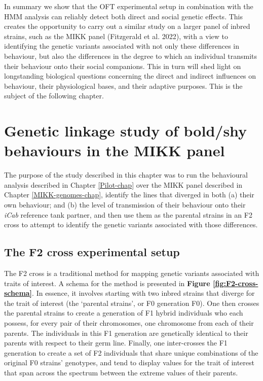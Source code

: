 \documentclass[
]{book}
\begin{document}
In summary we show that the OFT experimental setup in combination with the HMM analysis can reliably detect both direct and social genetic effects. This creates the opportunity to carry out a similar study on a larger panel of inbred strains, such as the MIKK panel (Fitzgerald et al. 2022), with a view to identifying the genetic variants associated with not only these differences in behaviour, but also the differences in the degree to which an individual transmits their behaviour onto their social companions. This in turn will shed light on longstanding biological questions concerning the direct and indirect influences on behaviour, their physiological bases, and their adaptive purposes. This is the subject of the following chapter.

\hypertarget{MIKK-F2-chap}{%
\chapter{Genetic linkage study of bold/shy behaviours in the MIKK panel}\label{MIKK-F2-chap}}

The purpose of the study described in this chapter was to run the behavioural analysis described in Chapter \ref{Pilot-chap} over the MIKK panel described in Chapter \ref{MIKK-genomes-chap}, identify the lines that diverged in both (a) their own behaviour; and (b) the level of transmission of their behaviour onto their \emph{\textcolor{iCab_424B4D}{iCab}} reference tank partner, and then use them as the parental strains in an F2 cross to attempt to identify the genetic variants associated with those differences.

\hypertarget{MIKK-F2-cross}{%
\section{The F2 cross experimental setup}\label{MIKK-F2-cross}}

The F2 cross is a traditional method for mapping genetic variants associated with traits of interest. A schema for the method is presented in \textbf{Figure \ref{fig:F2-cross-schema}}. In essence, it involves starting with two inbred strains that diverge for the trait of interest (the `parental strains', or F0 generation F0). One then crosses the parental strains to create a generation of F1 hybrid individuals who each possess, for every pair of their chromosomes, one chromosome from each of their parents. The individuals in this F1 generation are genetically identical to their parents with respect to their germ line. Finally, one inter-crosses the F1 generation to create a set of F2 individuals that share unique combinations of the original F0 strains' genotypes, and tend to display values for the trait of interest that span across the spectrum between the extreme values of their parents.
\end{document}
